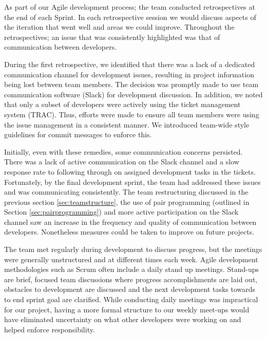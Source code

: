 \documentclass{l3proj}
\begin{document}

As part of our Agile development process; the team conducted retrospectives at the end of each Sprint. In each retrospective session we would discuss aspects of the iteration that went well and areas we could improve. Throughout the retrospectives; an issue that was consistently highlighted was that of communication between developers.

During the first retrospective, we identified that there was a lack of a dedicated communication channel for development issues, resulting in project information being lost between team members. The decision was promptly made to use team communication software (Slack) for development discussion. In addition, we noted that only a subset of developers were actively using the ticket management system (TRAC). Thus, efforts were made to ensure all team members were using the issue management in a consistent manner. We introduced team-wide style guidelines for commit messages to enforce this. 

Initially, even with these remedies, some communication concerns persisted. There was a lack of active communication on the Slack channel and a slow response rate to following through on assigned development tasks in the tickets. Fortunately, by the final development sprint, the team had addressed these issues and was communicating consistently. The team restructuring discussed in the previous section \ref{sec:teamstructure}, the use of pair programming (outlined in Section \ref{sec:pairprogramming}) and more active participation on the Slack channel saw an increase in the frequency and quality of communication between developers. Nonetheless measures could be taken to improve on future projects.

The team met regularly during development to discuss progress, but the meetings were generally unstructured and at different times each week. Agile development methodologies such as Scrum often include a daily stand up meetings. Stand-ups are brief, focused team discussions where progress accomplishments are laid out, obstacles to development are discussed and the next development tasks towards to end sprint goal are clarified. While conducting daily meetings was impractical for our project, having a more formal structure to our weekly meet-ups would have eliminated uncertainty on what other developers were working on and helped enforce responsibility. 
\end{document}
